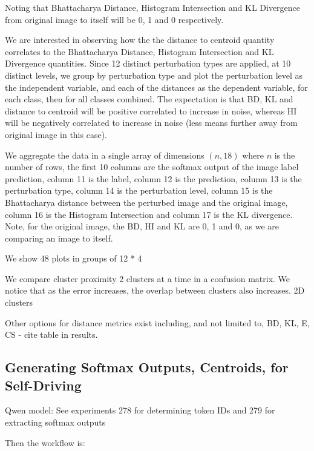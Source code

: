 Noting that Bhattacharya Distance, Histogram Intersection and KL Divergence from original image to itself will be 0, 1 and 0 respectively.

We are interested in observing how the the distance to centroid quantity correlates to the Bhattacharya Distance, Histogram Intersection and KL Divergence quantities. Since 12 distinct perturbation types are applied, at 10 distinct levels, we group by perturbation type and plot the perturbation level as the independent variable, and each of the distances as the dependent variable, for each class, then for all classes combined. The expectation is that BD, KL and distance to centroid will be positive correlated to increase in noise, whereas HI will be negatively correlated to increase in noise (less means further away from original image in this case).

We aggregate the data in a single array of dimensions $(n,18)$ where $n$ is the number of rows, the first 10 columns are the softmax output of the image label prediction, column 11 is the label, column 12 is the prediction, column 13 is the perturbation type, column 14 is the perturbation level, column 15 is the Bhattacharya distance between the perturbed image and the original image, column 16 is the Histogram Intersection and column 17 is the KL divergence. Note, for the original image, the BD, HI and KL are 0, 1 and 0, as we are comparing an image to itself.

We show 48 plots in groups of 12 * 4


We compare cluster proximity 2 clusters at a time in a confusion matrix. We notice that as the error increases, the overlap between clusters also increases. 2D clusters

Other options for distance metrics exist including, and not limited to, BD, KL, E, CS - cite table in results.

\subsection{Generating Softmax Outputs, Centroids, for Self-Driving}

Qwen model:
See experiments 278 for determining token IDs and 279 for extracting softmax outputs

Then the workflow is:

